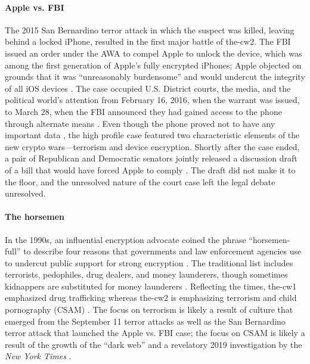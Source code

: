 \paragraph*{Apple vs. FBI} The 2015 San Bernardino terror attack in which the suspect was killed, leaving behind a
locked iPhone, resulted in the first major battle of \ac{the-cw2}. The \ac{FBI} issued an order under the \acrlong{AWA}
to compel Apple to unlock the device, which was among the first generation of Apple's fully encrypted iPhones; Apple
objected on grounds that it was ``unreasonably burdensome'' and would undercut the integrity of all iOS devices
\cite{schulze_clipper_2017}. The case occupied U.S. District courts, the media, and the political world's attention from
February 16, 2016, when the warrant was issued, to March 28, when the \ac{FBI} announced they had gained access to the
phone through alternate means \cite{novet_2016}. Even though the phone proved not to have any important data
\cite{schulze_clipper_2017}, the high profile case featured two characteristic elements of the new crypto
wars---terrorism and device encryption. Shortly after the case ended, a pair of Republican and Democratic senators
jointly released a discussion draft of a bill that would have forced Apple to comply \cite{burr_2016}. The draft did not
make it to the floor, and the unresolved nature of the court case left the legal debate unresolved.

\paragraph*{The \Ac{horsemen}} In the 1990s, an influential encryption advocate coined the phrase ``\ac{horsemen-full}'' to
describe four reasons that governments and law enforcement agencies use to undercut public support for strong encryption
\cite{may_1994}. The traditional list includes terrorists, pedophiles, drug dealers, and money launderers, though
sometimes kidnappers are substituted for money launderers \cite{schneier_scaring_2019}. Reflecting the times,
\ac{the-cw1} emphasized drug trafficking whereas \ac{the-cw2} is emphasizing terrorism and child pornography (\ac{CSAM})
\cite{schulze_clipper_2017}. The focus on terrorism is likely a result of culture that emerged from the September 11
terror attacks as well as the San Bernardino terror attack that launched the Apple vs. \ac{FBI} case; the focus on
\ac{CSAM} is likely a result of the growth of the ``dark web'' and a revelatory 2019 investigation by the \textit{New
York Times} \cite{keller_internet_2019}.

